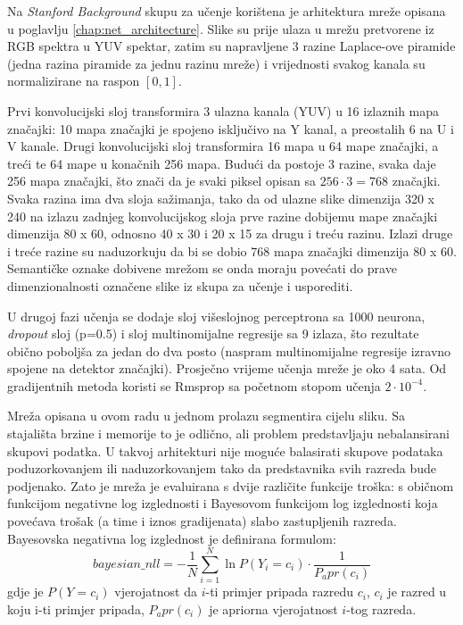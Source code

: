 \documentclass[times, utf8, diplomski, numeric]{fer}
\begin{document}
Na \textit{Stanford Background} skupu za učenje korištena je arhitektura mreže opisana u poglavlju \ref{chap:net_architecture}. Slike su prije ulaza u mrežu pretvorene iz RGB spektra u YUV spektar, zatim su napravljene 3 razine Laplace-ove piramide (jedna razina piramide za jednu razinu mreže) i vrijednosti svakog kanala su normalizirane na raspon $\left[ 0, 1 \right]$.

Prvi konvolucijski sloj transformira 3 ulazna kanala (YUV) u 16 izlaznih mapa značajki: 10 mapa značajki je spojeno isključivo na Y kanal, a preostalih 6 na U i V kanale. Drugi konvolucijski sloj transformira 16 mapa u 64 mape značajki, a treći te 64 mape u konačnih 256 mapa. Budući da postoje 3 razine, svaka daje 256 mapa značajki, što znači da je svaki piksel opisan sa $256 \cdot 3 = 768$ značajki. Svaka razina ima dva sloja sažimanja, tako da od ulazne slike dimenzija 320 x 240 na izlazu zadnjeg konvolucijskog sloja prve razine dobijemu mape značajki dimenzija 80 x 60, odnosno 40 x 30 i 20 x 15 za drugu i treću razinu. Izlazi druge i treće razine su naduzorkuju da bi se dobio 768 mapa značajki dimenzija 80 x 60. Semantičke oznake dobivene mrežom se onda moraju povećati do prave dimenzionalnosti označene slike iz skupa za učenje i usporediti.

U drugoj fazi učenja se dodaje sloj višeslojnog perceptrona sa 1000 neurona, \textit{dropout} sloj (p=0.5) i sloj multinomijalne regresije sa 9 izlaza, što rezultate obično poboljša za jedan do dva posto (naspram multinomijalne regresije izravno spojene na detektor značajki). Prosječno vrijeme učenja mreže je oko 4 sata. Od gradijentnih metoda koristi se Rmsprop sa početnom stopom učenja $2 \cdot 10^{-4}$.

Mreža opisana u ovom radu u jednom prolazu segmentira cijelu sliku. Sa stajališta brzine i memorije to je odlično, ali problem predstavljaju nebalansirani skupovi podatka. U takvoj arhitekturi nije moguće balasirati skupove podataka poduzorkovanjem ili naduzorkovanjem tako da predstavnika svih razreda bude podjenako. Zato je mreža je evaluirana s dvije različite funkcije troška: s običnom funkcijom negativne log izglednosti i Bayesovom funkcijom log izglednosti\cite{daylac} koja povećava trošak (a time i iznos gradijenata) slabo zastupljenih razreda. Bayesovska negativna log izglednost je definirana formulom:
\begin{equation}
  bayesian\_nll = - \frac{1}{N} \sum_{i=1}^{N} \ln P(Y_i = c_i) \cdot \frac{1}{P_apr(c_i)}
\end{equation}
gdje je $P(Y = c_i)$ vjerojatnost da $i$-ti primjer pripada razredu $c_i$, $c_i$ je razred u koju i-ti primjer pripada, $P_apr(c_i)$ je apriorna vjerojatnost $i$-tog razreda.
\end{document}
